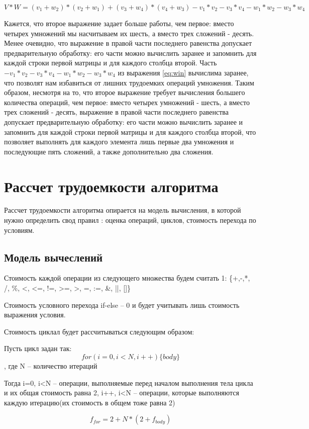 \begin{equation}
    V*W = (v_1 + w_2)*(v_2 + w_1) + (v_3 + w_4)*(v_4+w_3) - v_1 * v_2 - v_3 * v_4 - w_1 * w_2 - w_3 * w_4
    \label{eq:win}
\end{equation}

Кажется, что второе выражение задает больше работы, чем первое: вместо четырех умножений мы насчитываем их шесть, а вместо трех сложений - десять. Менее очевидно, что выражение в правой части последнего равенства допускает предварительную обработку: его части можно вычислить заранее и запомнить для каждой строки первой матрицы и для каждого столбца второй. 
Часть $- v_1 * v_2 - v_3 * v_4 - w_1 * w_2 - w_3 * w_4$ из выражения \ref{eq:win} вычислима заранее, что позволят нам избавиться от лишних трудоемких операций умножения.
 Таким образом, несмотря на то, что второе выражение требует вычисления большего количества операций, чем первое: вместо четырех умножений - шесть, а вместо трех сложений - десять, выражение в правой части последнего равенства допускает предварительную обработку: его части можно вычислить заранее и запомнить для каждой строки первой матрицы и для каждого столбца второй, что позволяет выполнять для каждого элемента лишь первые два умножения и последующие пять сложений, а также дополнительно два сложения.


\section{ Рассчет трудоемкости алгоритма}

Рассчет трудоемкости алгоритма опирается на модель вычисления, в которой нужно определить свод правил : оценка операций, циклов, стоимость перехода по условиям.

\subsection{Модель вычеслений}

Стоимость каждой операции из следующего множества будем считать 1:
\{+,-,*, /, \%, <, <=, !=, >=, >, =, :=, \&, ||, []\}

Стоимость условного перехода if-else -- 0 и будет учитывать лишь стоимость выражения условия.

Стоимость циклал будет рассчитываться следующим образом:

Пусть цикл задан так:
\begin{equation}
        for(i=0, i<N, i++) \{ body \}
\end{equation}
, где N -- количество итераций

Тогда
i=0, i<N -- операции, выполняемые перед началом выполнения тела цикла и их общая стоимость равна 2, 
i++, i<N -- операции, которые выполняются каждую итерацию(их стоимость в общем тоже равна 2)

\begin{equation}
    f_{for} = 2 + N*(2 + f_{body})
\end{equation}
